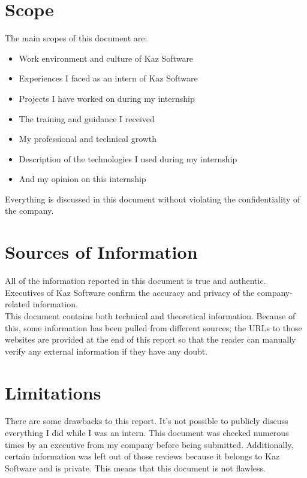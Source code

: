 \section{Scope}

The main scopes of this document are:

\begin{itemize}
    \item Work environment and culture of Kaz Software
    \item Experiences I faced as an intern of Kaz Software
    \item Projects I have worked on during my internship
    \item The training and guidance I received
    \item My professional and technical growth
    \item Description of the technologies I used during my internship
    \item And my opinion on this internship
\end{itemize}

Everything is discussed in this document without violating the confidentiality of the company.

\section{Sources of Information}

All of the information reported in this document is true and authentic.
Executives of Kaz Software confirm the accuracy and privacy of the company-related information.\\

This document contains both technical and theoretical information.
Because of this, some information has been pulled from different sources; the URLs to those websites are provided at the end of this report so that the reader can manually verify any external information if they have any doubt.

\section{Limitations}

There are some drawbacks to this report.
It's not possible to publicly discuss everything I did while I was an intern.
This document was checked numerous times by an executive from my company before being submitted.
Additionally, certain information was left out of those reviews because it belongs to Kaz Software and is private.
This means that this document is not flawless.